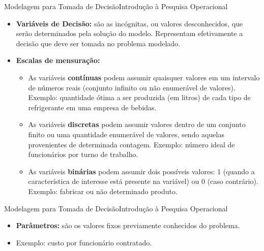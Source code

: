 \documentclass[t]{beamer}
\begin{document}
\begin{ftst}{Modelagem para Tomada de Decisão}{Introdução à Pesquisa Operacional}
\small
\begin{itemize}
    \item[\textbf{a.}] \textbf{Variáveis de Decisão: }são as incógnitas, ou valores desconhecidos, que serão determinados pela solução do modelo. Representam efetivamente a decisão que deve ser tomada no problema modelado.
    
    \item  \textbf{Escalas de mensuração:}
    \begin{itemize}
        \footnotesize
        \item As variáveis \textbf{contínuas} podem assumir quaisquer valores em um intervalo de números reais (conjunto infinito ou não enumerável de valores). Exemplo: quantidade ótima a ser produzida (em litros) de cada tipo de refrigerante em uma empresa de bebidas.
        \item As variáveis \textbf{discretas} podem assumir valores dentro de um conjunto finito ou uma quantidade enumerável de valores, sendo aquelas provenientes de determinada contagem. Exemplo:  número ideal de funcionários por turno de trabalho.
        \item As variáveis \textbf{binárias} podem assumir dois possíveis valores: 1 (quando a característica de interesse está presente na variável) ou 0 (caso contrário). Exemplo: fabricar ou não determinado produto.
    \end{itemize}
\end{itemize}

\end{ftst}


\begin{ftst}{Modelagem para Tomada de Decisão}{Introdução à Pesquisa Operacional}
\small
\begin{itemize}
    \item[\textbf{b.}] \textbf{Parâmetros:} são os valores fixos previamente conhecidos do problema.
    \vone
    \item Exemplo: custo por funcionário contratado.
\end{itemize}

\end{ftst}

\end{document}
